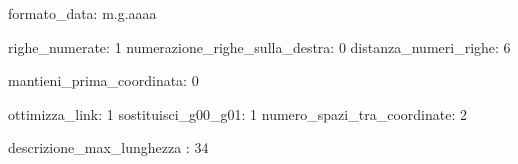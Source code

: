 formato_data: m.g.aaaa

righe_numerate:                 1
numerazione_righe_sulla_destra: 0
distanza_numeri_righe:          6

mantieni_prima_coordinata:      0

ottimizza_link:              1
sostituisci_g00_g01:         1
numero_spazi_tra_coordinate: 2

descrizione_max_lunghezza : 34